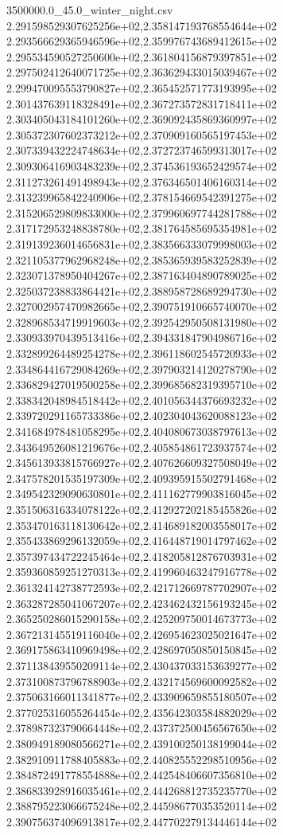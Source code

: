 \begin{filecontents*}{3500000.0_45.0_winter_night.csv}
2.291598529307625256e+02,2.358147193768554644e+02
2.293566629365946596e+02,2.359976743689412615e+02
2.295534590527250600e+02,2.361804156879397851e+02
2.297502412640071725e+02,2.363629433015039467e+02
2.299470095553790827e+02,2.365452571773193995e+02
2.301437639118328491e+02,2.367273572831718411e+02
2.303405043184101260e+02,2.369092435869360997e+02
2.305372307602373212e+02,2.370909160565197453e+02
2.307339432224748634e+02,2.372723746599313017e+02
2.309306416903483239e+02,2.374536193652429574e+02
2.311273261491498943e+02,2.376346501406160314e+02
2.313239965842240906e+02,2.378154669542391275e+02
2.315206529809833000e+02,2.379960697744281788e+02
2.317172953248838780e+02,2.381764585695354981e+02
2.319139236014656831e+02,2.383566333079998003e+02
2.321105377962968248e+02,2.385365939583252839e+02
2.323071378950404267e+02,2.387163404890789025e+02
2.325037238833864421e+02,2.388958728689294730e+02
2.327002957470982665e+02,2.390751910665740070e+02
2.328968534719919603e+02,2.392542950508131980e+02
2.330933970439513416e+02,2.394331847904986716e+02
2.332899264489254278e+02,2.396118602545720933e+02
2.334864416729084269e+02,2.397903214120278790e+02
2.336829427019500258e+02,2.399685682319395710e+02
2.338342048984518442e+02,2.401056344376693232e+02
2.339720291165733386e+02,2.402304043620088123e+02
2.341684978481058295e+02,2.404080673038797613e+02
2.343649526081219676e+02,2.405854861723937574e+02
2.345613933815766927e+02,2.407626609327508049e+02
2.347578201535197309e+02,2.409395915502791468e+02
2.349542329090630801e+02,2.411162779903816045e+02
2.351506316334078122e+02,2.412927202185455826e+02
2.353470163118130642e+02,2.414689182003558017e+02
2.355433869296132059e+02,2.416448719014797462e+02
2.357397434722245464e+02,2.418205812876703931e+02
2.359360859251270313e+02,2.419960463247916778e+02
2.361324142738772593e+02,2.421712669787702907e+02
2.363287285041067207e+02,2.423462432156193245e+02
2.365250286015290158e+02,2.425209750014673773e+02
2.367213145519116040e+02,2.426954623025021647e+02
2.369175863410969498e+02,2.428697050850150845e+02
2.371138439550209114e+02,2.430437033153639277e+02
2.373100873796788903e+02,2.432174569600092582e+02
2.375063166011341877e+02,2.433909659855180507e+02
2.377025316055264454e+02,2.435642303584882029e+02
2.378987323790664448e+02,2.437372500456567650e+02
2.380949189080566271e+02,2.439100250138199044e+02
2.382910911788405883e+02,2.440825552298510956e+02
2.384872491778554888e+02,2.442548406607356810e+02
2.386833928916035461e+02,2.444268812735235770e+02
2.388795223066675248e+02,2.445986770353520114e+02
2.390756374096913817e+02,2.447702279134446144e+02

\end{filecontents*}

